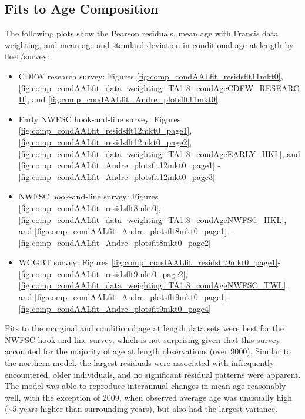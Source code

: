 \documentclass[
  english,
  a4paper,
]{article}
\providecommand{\tightlist}{%
  \setlength{\itemsep}{0pt}\setlength{\parskip}{0pt}}
\begin{document}
\hypertarget{fits-to-age-composition}{%
\subsection{Fits to Age Composition}\label{fits-to-age-composition}}

The following plots show the Pearson residuals, mean age with Francis data weighting, and
mean age and standard deviation in conditional age-at-length by fleet/survey:

\begin{itemize}
\tightlist
\item
  CDFW research survey: Figures \ref{fig:comp_condAALfit_residsflt11mkt0},
  \ref{fig:comp_condAALfit_data_weighting_TA1.8_condAgeCDFW_RESEARCH}, and \ref{fig:comp_condAALfit_Andre_plotsflt11mkt0}
\item
  Early NWFSC hook-and-line survey: Figures \ref{fig:comp_condAALfit_residsflt12mkt0_page1}, \ref{fig:comp_condAALfit_residsflt12mkt0_page2},
  \ref{fig:comp_condAALfit_data_weighting_TA1.8_condAgeEARLY_HKL}, and \ref{fig:comp_condAALfit_Andre_plotsflt12mkt0_page1} - \ref{fig:comp_condAALfit_Andre_plotsflt12mkt0_page3}
\item
  NWFSC hook-and-line survey: Figures \ref{fig:comp_condAALfit_residsflt8mkt0},
  \ref{fig:comp_condAALfit_data_weighting_TA1.8_condAgeNWFSC_HKL}, and \ref{fig:comp_condAALfit_Andre_plotsflt8mkt0_page1} - \ref{fig:comp_condAALfit_Andre_plotsflt8mkt0_page2}\\
\item
  WCGBT survey: Figures \ref{fig:comp_condAALfit_residsflt9mkt0_page1}- \ref{fig:comp_condAALfit_residsflt9mkt0_page2}, \ref{fig:comp_condAALfit_data_weighting_TA1.8_condAgeNWFSC_TWL}, and \ref{fig:comp_condAALfit_Andre_plotsflt9mkt0_page1}- \ref{fig:comp_condAALfit_Andre_plotsflt9mkt0_page4}
\end{itemize}

Fits to the marginal and conditional age at length data sets were best for the NWFSC hook-and-line survey, which is not surprising given that this survey accounted for the majority of age at length observations (over 9000). Similar to the northern model, the largest residuals were associated with infrequently encountered, older individuals, and no significant residual patterns were apparent. The model was able to reproduce interannual changes in mean age reasonably well, with the exception of 2009, when observed average age was unusually high (\textasciitilde5 years higher than surrounding years), but also had the largest variance.
\end{document}
